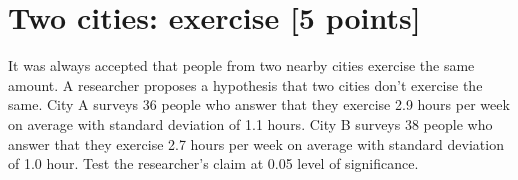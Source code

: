\documentclass{article}
\begin{document}
 

\newpage
\section{Two cities: exercise [5 points]} 
It was always accepted that people from two nearby cities exercise the same amount.
A researcher proposes  a hypothesis  that two cities don't exercise the same. 
City A surveys 36 people who answer that they exercise 2.9 hours per week on average with standard deviation of 1.1 hours. 
City B surveys 38 people who answer that they exercise 2.7 hours per week on average with standard deviation of 1.0 hour. 
Test the researcher's claim at 0.05 level of significance.\\
\end{document}
